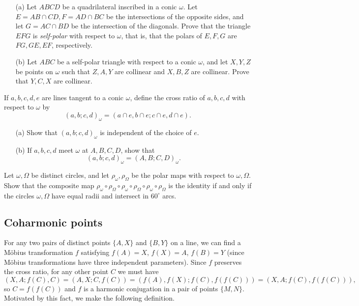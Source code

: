 \begin{exer}\label{selfpolar}\hspace{2em}
\begin{itemize}
\item[(a)] Let $ABCD$ be a quadrilateral inscribed in a conic $\omega$. Let $E = AB\cap CD, F = AD\cap BC$ be the intersections of the opposite sides, and let $G = AC\cap BD$ be the intersection of the diagonals. Prove that the triangle $EFG$ is \emph{self-polar} with respect to $\omega$, that is, that the polars of $E,F,G$ are $FG,GE,EF$, respectively.

\item[(b)] Let $ABC$ be a self-polar triangle with respect to a conic $\omega$, and let $X,Y,Z$ be points on $\omega$ such that $Z,A,Y$ are collinear and $X,B,Z$ are collinear. Prove that $Y,C,X$ are collinear.
\end{itemize}
\end{exer}

\begin{exer} If $a,b,c,d,e$ are lines tangent to a conic $\omega$, define the cross ratio of $a,b,c,d$ with respect to $\omega$ by
\[
(a,b;c,d)_\omega = (a\cap e,b\cap e;c\cap e,d\cap e).
\]
\begin{itemize}
\item[(a)] Show that $(a,b;c,d)_\omega$ is independent of the choice of $e$.

\item[(b)] If $a,b,c,d$ meet $\omega$ at $A,B,C,D$, show that
\[
(a,b;c,d)_\omega = (A,B;C,D)_\omega.
\]
\end{itemize}
\end{exer}

\begin{exer} Let $\omega, \Omega$ be distinct circles, and let $\rho_\omega, \rho_\Omega$ be the polar maps with respect to $\omega, \Omega$. Show that the composite map $\rho_\omega\circ\rho_\Omega\circ\rho_\omega\circ\rho_\Omega\circ\rho_\omega\circ\rho_\Omega$ is the identity if and only if the circles $\omega,\Omega$ have equal radii and intersect in $60^\circ$ arcs.
\end{exer}

\subsection{Coharmonic points}

For any two pairs of distinct points $\{A,X\}$ and $\{B,Y\}$ on a line, we can find a M\"obius transformation $f$ satisfying $f(A) = X$, $f(X) = A$, $f(B) = Y$ (since M\"obius transformations have three independent parameters). Since $f$ preserves the cross ratio, for any other point $C$ we must have
\[
(X,A;f(C),C) = (A,X;C,f(C)) = (f(A),f(X);f(C),f(f(C))) = (X,A;f(C),f(f(C))),
\]
so $C = f(f(C))$ and $f$ is a harmonic conjugation in a pair of points $\{M,N\}$. Motivated by this fact, we make the following definition.

